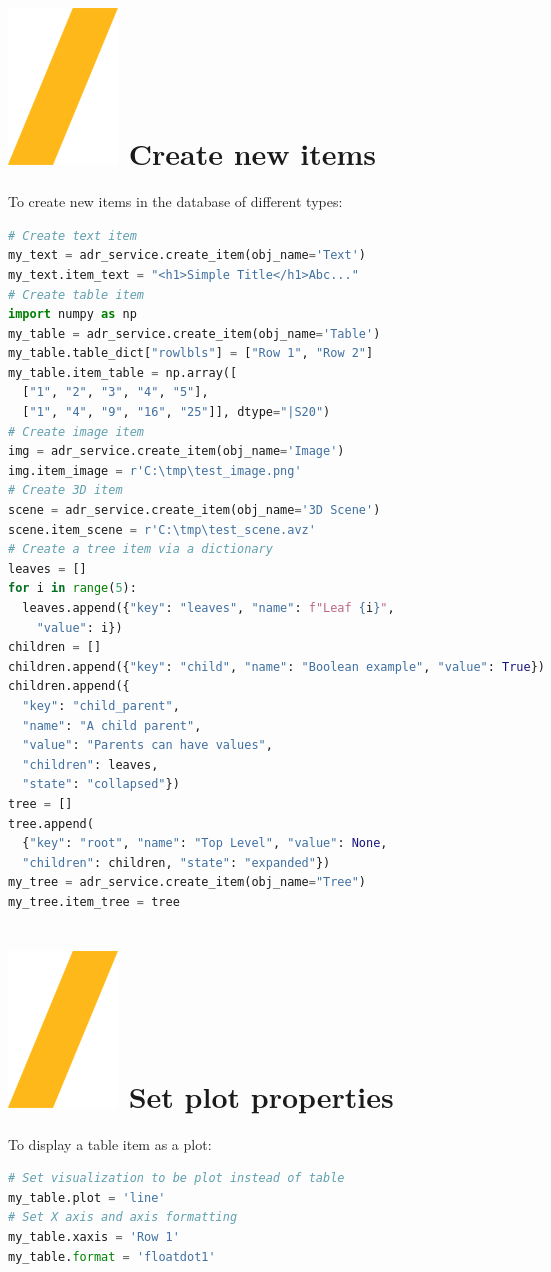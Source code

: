 \documentclass[9pt,landscape]{article}
\begin{document}
\begin{multicols}{3}
\section{\includegraphics[height=\fontcharht\font`\S]{slash.png}  Create new items}
To create new items in the database of different types:
\begin{lstlisting}[language=Python]
# Create text item
my_text = adr_service.create_item(obj_name='Text')
my_text.item_text = "<h1>Simple Title</h1>Abc..."
# Create table item
import numpy as np
my_table = adr_service.create_item(obj_name='Table')
my_table.table_dict["rowlbls"] = ["Row 1", "Row 2"]
my_table.item_table = np.array([
  ["1", "2", "3", "4", "5"], 
  ["1", "4", "9", "16", "25"]], dtype="|S20")
# Create image item
img = adr_service.create_item(obj_name='Image')
img.item_image = r'C:\tmp\test_image.png'
# Create 3D item
scene = adr_service.create_item(obj_name='3D Scene')
scene.item_scene = r'C:\tmp\test_scene.avz'
# Create a tree item via a dictionary
leaves = []
for i in range(5):
  leaves.append({"key": "leaves", "name": f"Leaf {i}",
    "value": i})
children = []
children.append({"key": "child", "name": "Boolean example", "value": True})
children.append({
  "key": "child_parent", 
  "name": "A child parent", 
  "value": "Parents can have values", 
  "children": leaves,
  "state": "collapsed"})
tree = []
tree.append(
  {"key": "root", "name": "Top Level", "value": None, 
  "children": children, "state": "expanded"})
my_tree = adr_service.create_item(obj_name="Tree")
my_tree.item_tree = tree
\end{lstlisting} 


\section{\includegraphics[height=\fontcharht\font`\S]{slash.png}  Set plot properties}
To display a table item as a plot:
\begin{lstlisting}[language=Python]
# Set visualization to be plot instead of table
my_table.plot = 'line'
# Set X axis and axis formatting
my_table.xaxis = 'Row 1'
my_table.format = 'floatdot1'
\end{lstlisting} 


\end{multicols}
\end{document}

